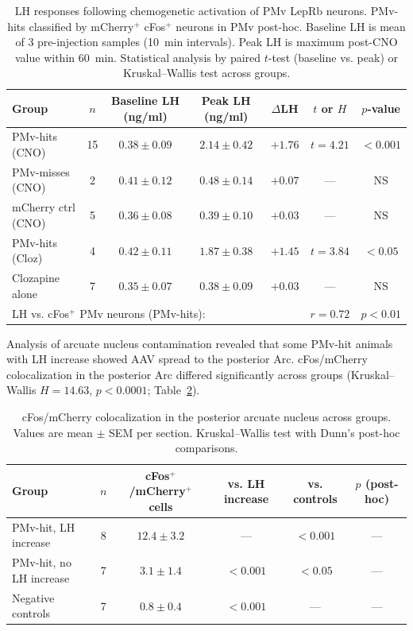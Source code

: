 \documentclass[11pt]{article}
\begin{document}
\begin{table}[H]
\centering
\caption{LH responses following chemogenetic activation of PMv LepRb neurons. PMv-hits classified by mCherry$^+$ cFos$^+$ neurons in PMv post-hoc. Baseline LH is mean of 3 pre-injection samples (10~min intervals). Peak LH is maximum post-CNO value within 60~min. Statistical analysis by paired $t$-test (baseline vs. peak) or Kruskal--Wallis test across groups.}
\label{tab:dreadd}
\begin{tabular}{lcccccc}
\toprule
\textbf{Group} & \textbf{$n$} & \textbf{Baseline LH (ng/ml)} & \textbf{Peak LH (ng/ml)} & \textbf{$\Delta$LH} & \textbf{$t$ or $H$} & \textbf{$p$-value} \\
\midrule
PMv-hits (CNO) & 15 & $0.38 \pm 0.09$ & $2.14 \pm 0.42$ & $+1.76$ & $t = 4.21$ & $< 0.001$ \\
PMv-misses (CNO) & 2 & $0.41 \pm 0.12$ & $0.48 \pm 0.14$ & $+0.07$ & --- & NS \\
mCherry ctrl (CNO) & 5 & $0.36 \pm 0.08$ & $0.39 \pm 0.10$ & $+0.03$ & --- & NS \\
PMv-hits (Cloz) & 4 & $0.42 \pm 0.11$ & $1.87 \pm 0.38$ & $+1.45$ & $t = 3.84$ & $< 0.05$ \\
Clozapine alone & 7 & $0.35 \pm 0.07$ & $0.38 \pm 0.09$ & $+0.03$ & --- & NS \\
\midrule
\multicolumn{5}{l}{LH vs. cFos$^+$ PMv neurons (PMv-hits):} & $r = 0.72$ & $p < 0.01$ \\
\bottomrule
\end{tabular}
\end{table}

Analysis of arcuate nucleus contamination revealed that some PMv-hit animals with LH increase showed AAV spread to the posterior Arc. cFos/mCherry colocalization in the posterior Arc differed significantly across groups (Kruskal--Wallis $H = 14.63$, $p < 0.0001$; Table~\ref{tab:arc}).

\begin{table}[H]
\centering
\caption{cFos/mCherry colocalization in the posterior arcuate nucleus across groups. Values are mean $\pm$ SEM per section. Kruskal--Wallis test with Dunn's post-hoc comparisons.}
\label{tab:arc}
\begin{tabular}{lccccc}
\toprule
\textbf{Group} & \textbf{$n$} & \textbf{cFos$^+$/mCherry$^+$ cells} & \textbf{vs. LH increase} & \textbf{vs. controls} & \textbf{$p$ (post-hoc)} \\
\midrule
PMv-hit, LH increase & 8 & $12.4 \pm 3.2$ & --- & $< 0.001$ & --- \\
PMv-hit, no LH increase & 7 & $3.1 \pm 1.4$ & $< 0.001$ & $< 0.05$ & --- \\
Negative controls & 7 & $0.8 \pm 0.4$ & $< 0.001$ & --- & --- \\
\bottomrule
\end{tabular}
\end{table}
\end{document}
